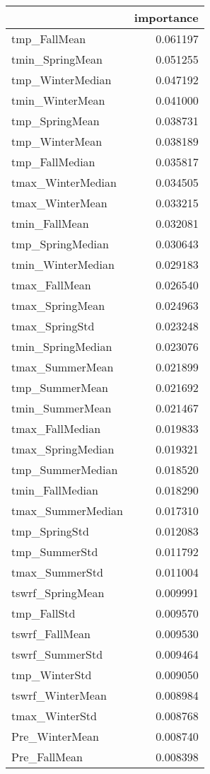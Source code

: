 \begin{tabular}{lr}
\toprule
 & importance \\
\midrule
tmp_FallMean & 0.061197 \\
tmin_SpringMean & 0.051255 \\
tmp_WinterMedian & 0.047192 \\
tmin_WinterMean & 0.041000 \\
tmp_SpringMean & 0.038731 \\
tmp_WinterMean & 0.038189 \\
tmp_FallMedian & 0.035817 \\
tmax_WinterMedian & 0.034505 \\
tmax_WinterMean & 0.033215 \\
tmin_FallMean & 0.032081 \\
tmp_SpringMedian & 0.030643 \\
tmin_WinterMedian & 0.029183 \\
tmax_FallMean & 0.026540 \\
tmax_SpringMean & 0.024963 \\
tmax_SpringStd & 0.023248 \\
tmin_SpringMedian & 0.023076 \\
tmax_SummerMean & 0.021899 \\
tmp_SummerMean & 0.021692 \\
tmin_SummerMean & 0.021467 \\
tmax_FallMedian & 0.019833 \\
tmax_SpringMedian & 0.019321 \\
tmp_SummerMedian & 0.018520 \\
tmin_FallMedian & 0.018290 \\
tmax_SummerMedian & 0.017310 \\
tmp_SpringStd & 0.012083 \\
tmp_SummerStd & 0.011792 \\
tmax_SummerStd & 0.011004 \\
tswrf_SpringMean & 0.009991 \\
tmp_FallStd & 0.009570 \\
tswrf_FallMean & 0.009530 \\
tswrf_SummerStd & 0.009464 \\
tmp_WinterStd & 0.009050 \\
tswrf_WinterMean & 0.008984 \\
tmax_WinterStd & 0.008768 \\
Pre_WinterMean & 0.008740 \\
Pre_FallMean & 0.008398 \\

\end{tabular}
